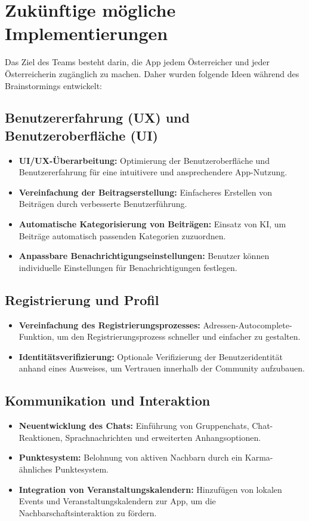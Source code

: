 \section{Zukünftige mögliche Implementierungen}

Das Ziel des Teams besteht darin, die App jedem Österreicher und jeder Österreicherin zugänglich zu machen. Daher wurden folgende Ideen während des Brainstormings entwickelt:

\subsection{Benutzererfahrung (UX) und Benutzeroberfläche (UI)}
\begin{itemize}
    \item \textbf{UI/UX-Überarbeitung:} Optimierung der Benutzeroberfläche und Benutzererfahrung für eine intuitivere und ansprechendere App-Nutzung.
    \item \textbf{Vereinfachung der Beitragserstellung:} Einfacheres Erstellen von Beiträgen durch verbesserte Benutzerführung.
    \item \textbf{Automatische Kategorisierung von Beiträgen:} Einsatz von KI, um Beiträge automatisch passenden Kategorien zuzuordnen.
    \item \textbf{Anpassbare Benachrichtigungseinstellungen:} Benutzer können individuelle Einstellungen für Benachrichtigungen festlegen.
\end{itemize}

\subsection{Registrierung und Profil}
\begin{itemize}
    \item \textbf{Vereinfachung des Registrierungsprozesses:} Adressen-Autocomplete-Funktion, um den Registrierungsprozess schneller und einfacher zu gestalten.
    \item \textbf{Identitätsverifizierung:} Optionale Verifizierung der Benutzeridentität anhand eines Ausweises, um Vertrauen innerhalb der Community aufzubauen.
\end{itemize}

\subsection{Kommunikation und Interaktion}
\begin{itemize}
    \item \textbf{Neuentwicklung des Chats:} Einführung von Gruppenchats, Chat-Reaktionen, Sprachnachrichten und erweiterten Anhangsoptionen.
    \item \textbf{Punktesystem:} Belohnung von aktiven Nachbarn durch ein Karma-ähnliches Punktesystem.
    \item \textbf{Integration von Veranstaltungskalendern:} Hinzufügen von lokalen Events und Veranstaltungskalendern zur App, um die Nachbarschaftsinteraktion zu fördern.

\end{itemize}

